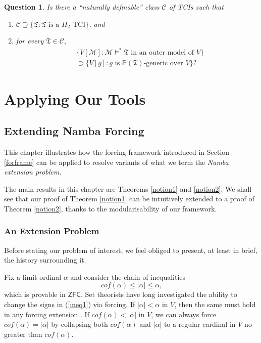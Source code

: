 \documentclass[12pt, twoside]{memoir}
\numberwithin{equation}{section}
\newtheorem{ques}[thm]{Question}
\theoremstyle{definition}
\theoremstyle{remark}
\theoremstyle{definition}
\theoremstyle{definition}
\theoremstyle{definition}
\theoremstyle{remark}
\begin{document}
\begin{ques}
Is there a ``naturally definable'' class $\mathcal{C}$ of TCIs such that 
\begin{enumerate}[label=(\alph*)]
    \item $\mathcal{C} \supsetneq \{\mathfrak{T} : \mathfrak{T} \text{ is a } \Pi_2 \text{ TCI}\}$, and
    \item for every $\mathfrak{T} \in \mathcal{C}$, 
    \begin{align*}
        & \{V[\mathcal{M}] : \mathcal{M} \models^* \mathfrak{T} \text{ in an outer model of } V\} \\
        & \supset \{V[g] : g \text{ is } \mathbb{P}(\mathfrak{T}) \text{-generic over } V\} \text{?}
    \end{align*}
\end{enumerate} 
\end{ques}

\part{\texorpdfstring{  Applying Our Tools}{Applying Our Tools}}

\chapter{Extending Namba Forcing}\label{sect2}

This chapter illustrates how the forcing framework introduced in Section \ref{forframe} can be applied to resolve variants of what we term the \textit{Namba extension problem}.

The main results in this chapter are Theorems \ref{notion1} and \ref{notion2}. We shall see that our proof of Theorem \ref{notion1} can be intuitively extended to a proof of Theorem \ref{notion2}, thanks to the modularisability of our framework.

\section{An Extension Problem}

Before stating our problem of interest, we feel obliged to present, at least in brief, the history surrounding it. 

Fix a limit ordinal $\alpha$ and consider the chain of inequalities
\begin{equation}\label{ineq1}
    cof(\alpha) \leq |\alpha| \leq \alpha \text{,}
\end{equation} 
which is provable in $\mathsf{ZFC}$. Set theorists have long investigated the ability to change the signs in (\ref{ineq1}) via forcing. If $|\alpha| < \alpha$ in $V$, then the same must hold in any forcing extension . If $cof(\alpha) < |\alpha|$ in $V$, we can always force $cof(\alpha) = |\alpha|$ by collapsing both $cof(\alpha)$ and $|\alpha|$ to a regular cardinal in $V$ no greater than $cof(\alpha)$.
\end{document}
